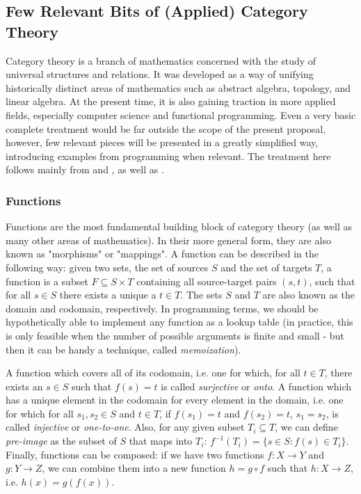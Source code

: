 \documentclass[12pt,a4paper]{article}
\begin{document}
\subsection{Few Relevant Bits of (Applied) Category Theory}
\label{ref:categorytheory}

Category theory is a branch of mathematics concerned with the study of universal structures and relations. It was developed as a way of unifying historically distinct areas of mathematics such as abstract algebra, topology, and linear algebra. At the present time, it is also gaining traction in more applied fields, especially computer science and functional programming. Even a very basic complete treatment would be far outside the scope of the present proposal, however, few relevant pieces will be presented in a greatly simplified way, introducing examples from programming when relevant. The treatment here follows mainly from \cite{fong2019} and \cite{Milewski2018}, as well as \cite{leinster2014}.

\subsubsection{Functions}
\label{sec:functions}

Functions are the most fundamental building block of category theory (as well as many other areas of mathematics). In their more general form, they are also known as "morphisms" or "mappings". A function can be described in the following way: given two sets, the set of sources $S$ and the set of targets $T$, a function is a subset $F \subseteq S \times T$ containing all source-target pairs $(s, t)$, such that for all $s \in S$ there exists a unique a $t \in T$. The sets $S$ and $T$ are also known as the domain and codomain, respectively. In programming terms, we should be hypothetically able to implement any function as a lookup table (in practice, this is only feasible when the number of possible arguments is finite and small - but then it can be handy a technique, called \textit{memoization}).  

A function which covers all of its codomain, i.e. one for which, for all $t \in T$, there exists an $s \in S$ such that $f(s) = t$ is called \textit{surjective} or \textit{onto}. A function which has a unique element in the codomain for every element in the domain, i.e. one for which for all $s_1, s_2 \in S$ and $t \in T$, if $f(s_1) = t$ and $f(s_2) = t$, $s_1 = s_2$, is called \textit{injective} or \textit{one-to-one}. Also, for any given subset $T_i \subseteq T$, we can define \textit{pre-image} as the subset of $S$ that maps into $T_i$: $f^{-1}(T_i) = \{ s \in S : f(s) \in T_i \}$. Finally, functions can be composed: if we have two functions $f: X \to Y$ and $g: Y \to Z$, we can combine them into a new function $h = g \circ f$ such that $h: X \to Z$, i.e. $h(x) = g(f(x))$. 
\end{document}
